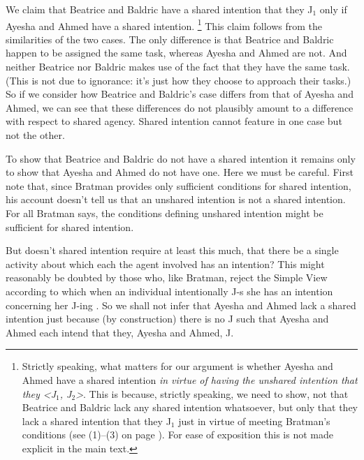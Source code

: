 \documentclass[12pt,\papersize]{extarticle}
\begin{document}
We claim that Beatrice and Baldric have a shared intention that they J$_1$
only if 
Ayesha and Ahmed have a shared intention.%
\footnote{
Strictly speaking, 
	what matters for our argument is whether Ayesha and Ahmed have a shared intention \emph{in virtue of having the unshared intention that they <J$_1$, J$_2$>}.
	This is because, strictly speaking, we need to show, not that Beatrice and Baldric lack any shared intention whatsoever, but only that they lack a shared intention that they J$_1$ just in virtue of meeting Bratman's conditions (see (1)--(3) on page  \pageref{quote:bratman_account}). 
	For ease of exposition this is not made explicit in the main text.
} 
This claim follows from the similarities of the two cases.
The only difference is that Beatrice and Baldric happen to be assigned the same task, whereas Ayesha and Ahmed are not.
And neither Beatrice nor Baldric makes use of the fact that they have the same task. 
(This is not due to ignorance: it's just how they choose to approach their tasks.)
So if we consider  how  
		 Beatrice and Baldric's case
	differs from
		 that of Ayesha and Ahmed,
we can see that these differences do not plausibly amount to a difference with respect to shared agency.
Shared intention cannot feature in one case but not the other.

To show that Beatrice and Baldric do not have a shared intention it remains only to show that Ayesha and Ahmed do not have one. 
Here we must be careful.
First note that,
	 since Bratman provides only sufficient conditions for shared intention, 
	 his account doesn't tell us that an unshared intention is not a shared intention.
For all Bratman says, the conditions defining unshared intention might  be sufficient for shared intention. 

But doesn't shared intention require at least this much,
that there be a single activity  about which each the agent involved has an intention? 
This might reasonably be doubted by those who, like Bratman, reject the Simple View according to which when an individual intentionally J-s she has an intention concerning her J-ing \citep{Bratman:1984jr}.
So 
	we shall not infer  that Ayesha and Ahmed lack a shared intention
	just because (by construction) there is no J such that Ayesha and Ahmed each intend that they, Ayesha and Ahmed, J.
\end{document}
